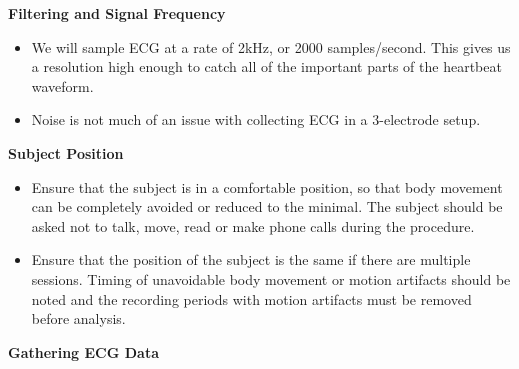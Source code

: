 \documentclass[]{book}
\providecommand{\tightlist}{%
  \setlength{\itemsep}{0pt}\setlength{\parskip}{0pt}}
\begin{document}
\textbf{Filtering and Signal Frequency}

\begin{itemize}
\tightlist
\item
  We will sample ECG at a rate of 2kHz, or 2000 samples/second. This gives us a resolution high enough to catch all of the important parts of the heartbeat waveform.
\item
  Noise is not much of an issue with collecting ECG in a 3-electrode setup.
\end{itemize}

\textbf{Subject Position}

\begin{itemize}
\tightlist
\item
  Ensure that the subject is in a comfortable position, so that body movement can be completely avoided or reduced to the minimal. The subject should be asked not to talk, move, read or make phone calls during the procedure.
\item
  Ensure that the position of the subject is the same if there are multiple sessions. Timing of unavoidable body movement or motion artifacts should be noted and the recording periods with motion artifacts must be removed before analysis.
\end{itemize}

\textbf{Gathering ECG Data}
\end{document}
